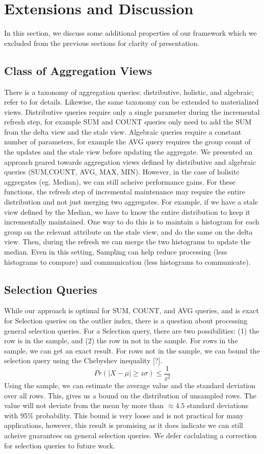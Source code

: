\section{Extensions and Discussion}
In this section, we discuss some additional properties of our framework which
we excluded from the previous sections for clarity of presentation.

\subsection{Class of Aggregation Views}
There is a taxonomy of aggregation queries: distributive, holistic, and algebraic; refer to \cite{gray1997data} for details.
Likewise, the same taxonomy can be extended to materialized views.
Distributive queries require only a single parameter during the incremental refresh step, for example SUM and COUNT queries only need to
add the SUM from the delta view and the stale view.
Algebraic queries require a constant number of parameters, for example the AVG query requires the group count of the updates and the stale view before updating the aggregate.
We presented an approach geared towards aggregation views defined by distributive and algebraic queries (SUM,COUNT, AVG, MAX, MIN).
However, in the case of holisitc aggregates (eg. Median), we can still acheive performance gains.
For these functions, the refresh step of incremental maintenance may require the entire distribution and not just merging two aggregates.
For example, if we have a stale view defined by the Median, we have to know the entire distribution to keep it incrementally maintained.
One way to do this is to maintain a histogram for each group on the relevant attribute on the stale view, and do the same on the delta view.
Then, during the refresh we can merge the two histograms to update the median.
Even in this setting, Sampling can help reduce processing (less histograms to compare) and communication (less histograms to communicate). 

\subsection{Selection Queries}
While our approach is optimal for SUM, COUNT, and AVG queries, and is exact for Selection queries on the outlier index, there is a question about processing general selection queries.
For a Selection query, there are two possibilities: (1) the row is in the sample, and (2) the row in not in the sample.
For rows in the sample, we can get an exact result.
For rows not in the sample, we can bound the selection query using the Chebyshev inequality [?].
\begin{equation}
Pr(|X-\mu|\ge z\sigma)\le \frac{1}{z^2}
\end{equation}
Using the sample, we can estimate the average value and the standard deviation over all rows.
This, gives us a bound on the distribution of unsampled rows.
The value will not deviate from the mean by more than $\approx 4.5$ standard deviations with 95\% probability.
This bound is very loose and is not practical for many applications, however, this result is promising as it does indicate 
we can still acheive guarantees on general selection queries.
We defer caclulating a correction for selection queries to future work.

